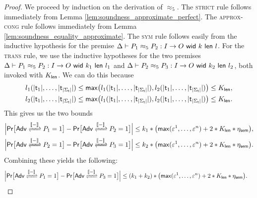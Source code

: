 \begin{proof}
We proceed by induction on the derivation of $\approx_5$. The \textsc{strict} rule follows immediately from Lemma \ref{lem:soundness_approximate_perfect}. The \textsc{approx-cong} rule follows immediately from Lemma \ref{lem:soundness_equality_approximate}. The \textsc{sym} rule follows easily from the inductive hypothesis for the premise $\Delta \vdash \lapproxeq{P_1}{P_2}{I}{O}{k}{l}{5}$. For the \textsc{trans} rule, we use the inductive hypotheses for the two premises $\Delta \vdash \lapproxeq{P_1}{P_2}{I}{O}{k_1}{l_1}{5}$ and $\Delta \vdash \lapproxeq{P_2}{P_3}{I}{O}{k_2}{l_2}{5}$, both invoked with $K_\length$. We can do this because
\begin{align*}
& l_1(|\type_1|,\ldots,|\type_{|\Sigma_\mathsf{t}|}|) \leq \max\big(l_1(|\type_1|,\ldots,|\type_{|\Sigma_\mathsf{t}|}|), l_2(|\type_1|,\ldots,|\type_{|\Sigma_\mathsf{t}|}|)\big) \leq K_\length, \\
& l_2(|\type_1|,\ldots,|\type_{|\Sigma_\mathsf{t}|}|) \leq \max\big(l_1(|\type_1|,\ldots,|\type_{|\Sigma_\mathsf{t}|}|), l_2(|\type_1|,\ldots,|\type_{|\Sigma_\mathsf{t}|}|)\big) \leq K_\length.
\end{align*}
This gives us the two bounds
\begin{align*}
& \Big|\mathsf{Pr}\big[\interaction{\Adv}{P_1}{\int{-}} = 1\big] - \mathsf{Pr}\big[\interaction{\Adv}{P_2}{\int{-}} = 1\big]\Big| \leq k_1 * \big(\max(\varepsilon^1,\ldots,\varepsilon^n) + 2 * K_\length * \eta_\sem\big),\\
& \Big|\mathsf{Pr}\big[\interaction{\Adv}{P_2}{\int{-}} = 1\big] - \mathsf{Pr}\big[\interaction{\Adv}{P_3}{\int{-}} = 1\big]\Big| \leq k_2 * \big(\max(\varepsilon^1,\ldots,\varepsilon^n) + 2 * K_\length * \eta_\sem\big).
\end{align*}
Combining these yields the following:
\begin{align*}
& \Big|\mathsf{Pr}\big[\interaction{\Adv}{P_1}{\int{-}} = 1\big] - \mathsf{Pr}\big[\interaction{\Adv}{P_3}{\int{-}} = 1\big]\Big| \leq (k_1 + k_2) * \big(\max(\varepsilon^1,\ldots,\varepsilon^n) + 2 * K_\length * \eta_\sem\big).
\end{align*}
\end{proof}


